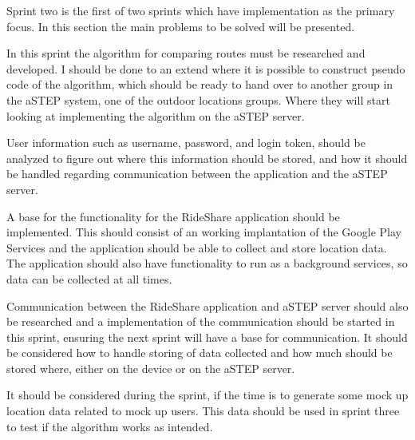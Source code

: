 Sprint two is the first of two sprints which have implementation as the primary focus. In this section the main problems to be solved will be presented.

In this sprint the algorithm for comparing routes must be researched and developed. I should be done to an extend where it is possible to construct pseudo code of the algorithm, which should be ready to hand over to another group in the aSTEP system, one of the outdoor locations groups. Where they will start looking at implementing the algorithm on the aSTEP server.

User information such as username, password, and login token, should be analyzed to figure out where this information should be stored, and how it should be handled regarding communication between the application and the aSTEP server. 

A base for the functionality for the RideShare application should be implemented. This should consist of an working implantation of the Google Play Services and the application should be able to collect and store location data. The application should also have functionality to run as a background services, so data can be collected at all times.

Communication between the RideShare application and aSTEP server should also be researched and a implementation of the communication should be started in this sprint, ensuring the next sprint will have a base for communication. It should be considered how to handle storing of data collected and how much should be stored where, either on the device or on the aSTEP server.

It should be considered during the sprint, if the time is to generate some mock up location data related to mock up users. This data should be used in sprint three to test if the algorithm works as intended.